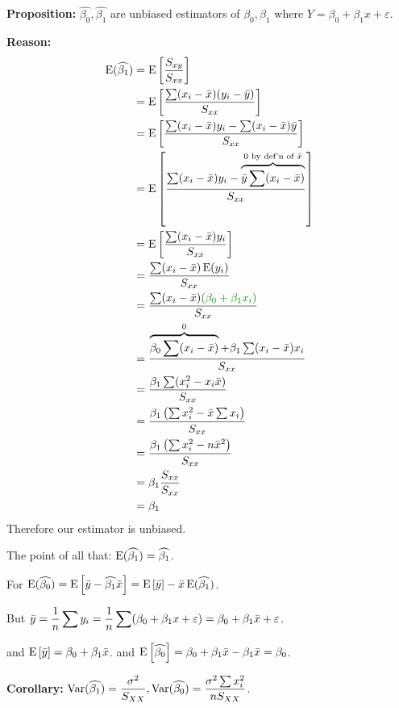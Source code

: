 \nnl\textbf{Proposition:} $\widehat{\beta_0}, \widehat{\beta_1}$ are unbiased estimators of $\beta_0, \beta_1$ where $Y = \beta_0 + \beta_1x + \varepsilon$.

\nl \textbf{Reason:} 
\begin{align*}
    \E*{\widehat{\beta_1}} &= \Eb{\frac{S_{xy}}{S_{xx}}}\\
    &= \Eb{\frac{\sum (x_i - \bar{x})(y_i - \bar{y})}{S_{xx}}}\\
    &= \Eb{\frac{\sum (x_i - \bar{x})y_i - \sum (x_i - \bar{x})\bar{y}}{S_{xx}}}\\
    &= \Eb{\frac{\sum(x_i - \bar{x})y_i - \overbrace{\bar{y} \sum(x_i - \bar{x})}^{0 \text{ by def'n of } \bar{x}}}{S_{xx}}}\\
    &= \Eb{\frac{\sum (x_i - \bar{x})y_i}{S_{xx}}}\\
    &= \frac{\sum (x_i - \bar{x}) \E*{y_i}}{S_{xx}}\\
    &= \frac{\sum (x_i - \bar{x}) \setGreen{(\beta_0 + \beta_1 x_i)}}{S_{xx}}\\
    &= \frac{\overbrace{\beta_0 \sum (x_i - \bar{x})}^{0} + \beta_1 \sum (x_i - \bar{x})x_i}{S_{xx}}\\
    &= \frac{\beta_1 \sum (x_i^2 - x_i \bar{x})}{S_{xx}}\\
    &= \frac{\beta_1 \pars{\sum x_i^2 - \bar{x} \sum x_i}}{S_{xx}}\\
    &= \frac{\beta_1 \pars{\sum x_i^2 - n\bar{x}^2}}{S_{xx}}\\
    &= \beta_1 \frac{S_{xx}}{S_{xx}}\\
    &= \beta_1
\end{align*}
Therefore our estimator is unbiased.

\nl The point of all that: $\E*{\widehat{\beta_1}} = \widehat{\beta_1}$.

\nl For $\E*{\widehat{\beta_0}} = \Eb{\bar{y} -\widehat{\beta_1} \bar{x}} = \Eb{\bar{y}} - \bar{x} \E*{\widehat{\beta_1}}$.

\nl But $\displaystyle \bar{y} = \over{n} \sum y_i = \over{n} \sum (\beta_0 + \beta_1 x + \varepsilon) = \beta_0 + \beta_1 \bar{x} + \varepsilon$.

\nl and $\Eb{\bar{y}} = \beta_0 + \beta_1 \bar{x}$. and $\Eb{\widehat{\beta_0}} = \beta_0 + \beta_1 \bar{x} - \beta_1 \bar{x} = \beta_0$.


\nnl \textbf{Corollary:} $\displaystyle \Var*{\widehat{\beta_1}} = \dfrac{\sigma^2}{S_{XX}}, \Var*{\widehat{\beta_0}} = \frac{\sigma^2 \sum x_i^2}{nS_{XX}} $.

